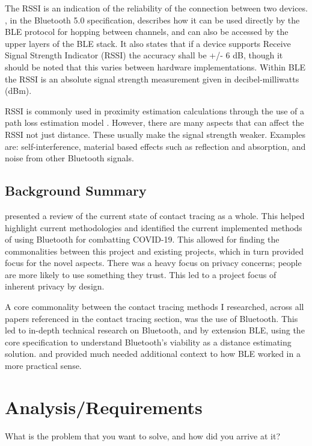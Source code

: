\documentclass{l4proj}
\begin{document}
The RSSI is an indication of the reliability of the connection between two devices. \citet{SIG5.0}, in the Bluetooth 5.0 specification, describes how it can be used directly by the BLE protocol for hopping between channels, and can also be accessed by the upper layers of the BLE stack. It also states that if a device supports Receive Signal Strength Indicator (RSSI) the accuracy shall be +/- 6 dB, though it should be noted that this varies between hardware implementations. Within BLE the RSSI is an absolute signal strength measurement given in decibel-milliwatts (dBm).

RSSI is commonly used in proximity estimation calculations through the use of a path loss estimation model \citep{ahmed_survey_2020}. However, there are many aspects that can affect the RSSI not just distance. These usually make the signal strength weaker. Examples are: self-interference, material based effects such as reflection and absorption, and noise from other Bluetooth signals.

\section{Background Summary}

\citet{ahmed_survey_2020} presented a review of the current state of contact tracing as a whole. This helped highlight current methodologies and identified the current implemented methods of using Bluetooth for combatting COVID-19. This allowed for finding the commonalities between this project and existing projects, which in turn provided focus for the novel aspects. There was a heavy focus on privacy concerns; people are more likely to use something they trust. This led to a project focus of inherent privacy by design.

A core commonality between the contact tracing methods I researched, across all papers referenced in the contact tracing section, was the use of Bluetooth. This led to in-depth technical research on Bluetooth, and by extension BLE, using the core specification \citep{SIG5.0} to understand Bluetooth's viability as a distance estimating solution. \citet{gomez_overview_2012} and \citet{yang_beyond_2020} provided much needed additional context to how BLE worked in a more practical sense.

\chapter{Analysis/Requirements}
What is the problem that you want to solve, and how did you arrive at it?
\end{document}

